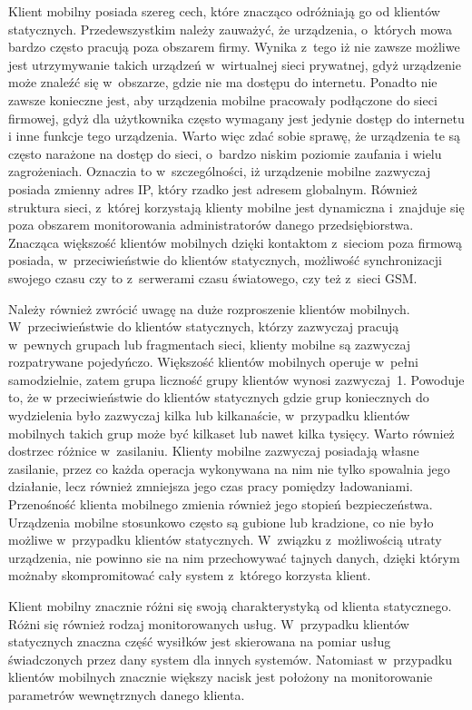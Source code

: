 Klient mobilny posiada szereg cech, które znacząco odróżniają go od
klientów statycznych. Przedewszystkim należy zauważyć, że urządzenia,
o~których mowa bardzo często pracują poza obszarem firmy. Wynika
z~tego iż nie zawsze możliwe jest utrzymywanie takich urządzeń
w~wirtualnej sieci prywatnej, gdyż urządzenie może znaleźć się
w~obszarze, gdzie nie ma dostępu do internetu. Ponadto nie zawsze
konieczne jest, aby urządzenia mobilne pracowały podłączone do sieci
firmowej, gdyż dla użytkownika często wymagany jest jedynie dostęp do
internetu i inne funkcje tego urządzenia. Warto więc zdać sobie
sprawę, że urządzenia te są często narażone na dostęp do sieci,
o~bardzo niskim poziomie zaufania i wielu zagrożeniach. Oznaczia to
w~szczególności, iż urządzenie mobilne zazwyczaj posiada zmienny adres
IP, który rzadko jest adresem globalnym. Również struktura sieci,
z~której korzystają klienty mobilne jest dynamiczna i~znajduje się
poza obszarem monitorowania administratorów danego
przedsiębiorstwa. Znacząca większość klientów mobilnych dzięki
kontaktom z~sieciom poza firmową posiada, w~przeciwieństwie do
klientów statycznych, możliwość synchronizacji swojego czasu czy to
z~serwerami czasu światowego, czy też z~sieci GSM.

Należy również zwrócić uwagę na duże rozproszenie klientów
mobilnych. W~przeciwieństwie do klientów statycznych, którzy zazwyczaj
pracują w~pewnych grupach lub fragmentach sieci, klienty mobilne są
zazwyczaj rozpatrywane pojedyńczo. Większość klientów mobilnych
operuje w~pełni samodzielnie, zatem grupa liczność grupy klientów
wynosi zazwyczaj~1. Powoduje to, że w przeciwieństwie do klientów
statycznych gdzie grup koniecznych do wydzielenia było zazwyczaj kilka
lub kilkanaście, w~przypadku klientów mobilnych takich grup może być
kilkaset lub nawet kilka tysięcy. Warto również dostrzec różnice
w~zasilaniu. Klienty mobilne zazwyczaj posiadają własne zasilanie,
przez co każda operacja wykonywana na nim nie tylko spowalnia jego
działanie, lecz również zmniejsza jego czas pracy pomiędzy
ładowaniami. Przenośność klienta mobilnego zmienia również jego
stopień bezpieczeństwa. Urządzenia mobilne stosunkowo często są
gubione lub kradzione, co nie było możliwe w~przypadku klientów
statycznych. W~związku z~możliwością utraty urządzenia, nie powinno
sie na nim przechowywać tajnych danych, dzięki którym możnaby
skompromitować cały system z~którego korzysta klient.

Klient mobilny znacznie różni się swoją charakterystyką od klienta
statycznego. Różni się również rodzaj monitorowanych
usług. W~przypadku klientów statycznych znaczna część wysiłków jest
skierowana na pomiar usług świadczonych przez dany system dla innych
systemów. Natomiast w~przypadku klientów mobilnych znacznie większy
nacisk jest położony na monitorowanie parametrów wewnętrznych danego
klienta.

